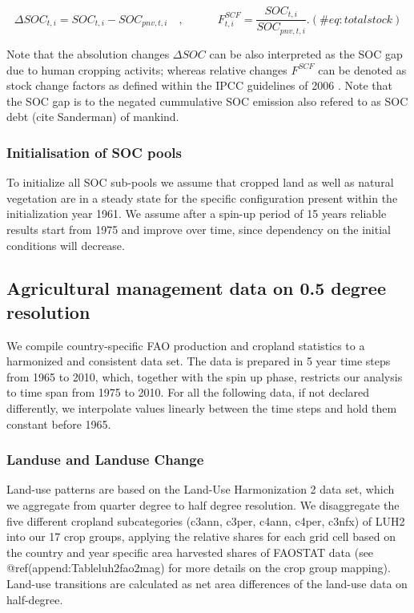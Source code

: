 \documentclass[gc, manuscript]{copernicus}
\begin{document}
\begin{equation}
\Delta SOC_{t, i} = SOC_{t, i} - SOC_{pnv, t, i}\quad, \qquad \quad  F^{SCF}_{t, i} = \frac{SOC_{t, i}}{SOC_{pnv, t, i}}.
(\#eq:totalstock)
\end{equation}

Note that the absolution changes \(\Delta SOC\) can be also interpreted
as the SOC gap due to human cropping activits; whereas relative changes
\(F^{SCF}\) can be denoted as stock change factors as defined within the
IPCC guidelines of 2006 \citep{ipcc_2006_2006}. Note that the SOC gap is
to the negated cummulative SOC emission also refered to as SOC debt
(cite Sanderman) of mankind.

\subsubsection{Initialisation of SOC pools}

To initialize all SOC sub-pools we assume that cropped land as well as
natural vegetation are in a steady state for the specific configuration
present within the initialization year 1961. We assume after a spin-up
period of 15 years reliable results start from 1975 and improve over
time, since dependency on the initial conditions will decrease.

\newpage

\hypertarget{sec:agrimanagement}{%
\subsection{Agricultural management data on 0.5 degree
resolution}\label{sec:agrimanagement}}

We compile country-specific FAO production and cropland statistics
\citep{faostat_faostat_2016} to a harmonized and consistent data set.
The data is prepared in 5 year time steps from 1965 to 2010, which,
together with the spin up phase, restricts our analysis to time span
from 1975 to 2010. For all the following data, if not declared
differently, we interpolate values linearly between the time steps and
hold them constant before 1965.

\hypertarget{sec:landuse}{%
\subsubsection{Landuse and Landuse Change}\label{sec:landuse}}

Land-use patterns are based on the Land-Use Harmonization 2
\citep{Hurtt2020} data set, which we aggregate from quarter degree to
half degree resolution. We disaggregate the five different cropland
subcategories (c3ann, c3per, c4ann, c4per, c3nfx) of LUH2 into our 17
crop groups, applying the relative shares for each grid cell based on
the country and year specific area harvested shares of FAOSTAT data
\citep{faostat_faostat_2016} (see @ref(append:Tableluh2fao2mag) for more
details on the crop group mapping). Land-use transitions are calculated
as net area differences of the land-use data on half-degree.
\end{document}
